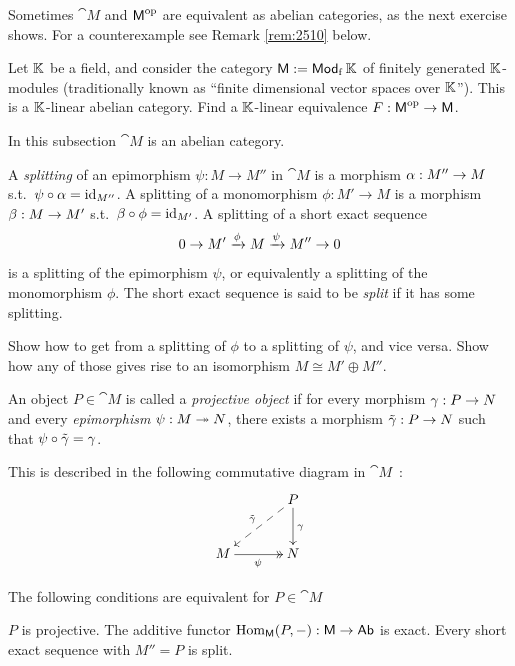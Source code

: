 Sometimes $\cat{M}$ and $\operatorname{\mathsf{M}}^{\mathrm{op}}$ are equivalent as abelian 
categories, as the next exercise shows. For a counterexample see Remark 
\ref{rem:2510} below. 

\begin{exer} \label{exer:2515}
Let $\mathbb{K}$ be a field, and consider the category 
$\operatorname{\mathsf{M}} := \operatorname{\mathsf{Mod}}_{\mathrm{f}} \mathbb{K}$
of finitely generated $\mathbb{K}$-modules (traditionally known as ``finite dimensional 
vector spaces over $\mathbb{K}$''). This is a $\mathbb{K}$-linear abelian category. 
Find a $\mathbb{K}$-linear equivalence
$F : \operatorname{\mathsf{M}}^{\mathrm{op}} \to \operatorname{\mathsf{M}}$.
\end{exer}



In this subsection $\cat{M}$ is an abelian category.

A {\em splitting} of an epimorphism 
$\psi : M \to M''$ in $\cat{M}$ is a morphism
$\alpha : M'' \to M$ s.t.\ $\psi \circ \alpha = \operatorname{id}_{M''}$.
A splitting of a monomorphism 
$\phi : M' \to M$ is  a morphism $\beta : M \to M'$ s.t.\ 
$\beta \circ \phi = \operatorname{id}_{M'}$.
A splitting of a short exact sequence 
\begin{equation} \label{eqn:1035}
0 \to M' \xrightarrow{\phi} M \xrightarrow{\psi} M'' \to 0
\end{equation}
is a splitting of the epimorphism $\psi$, or equivalently a splitting of the
mono\-morphism $\phi$. The short exact sequence is said to be {\em split} if it
has some splitting. 

\begin{exer} \label{exe:1035}
Show how to get from a splitting of $\phi$  to a splitting of $\psi$, and vice 
versa. Show how any of those gives rise to an isomorphism 
$M \cong M' \oplus M''$. 
\end{exer}

\begin{dfn}
An object $P \in \cat{M}$ is called a 
{\em projective object}%
if for every morphism $\gamma : P \to N$ and every {\em epimorphism}
$\psi : M \twoheadrightarrow N$, there exists a morphism 
$\tilde{\gamma} : P \to N$ such that 
$\psi \circ \tilde{\gamma} = \gamma$. 
\end{dfn}

This is described in the following commutative diagram in $\cat{M}$~: 
\[ \UseTips  \xymatrix @C=8ex @R=6ex {
&
P
\ar[d]^{\ga}
\ar@{-->}[dl]_{\til{\ga}}
\\
M 
\ar@{->>}[r]_{\psi}
&
N
} \]


\begin{prop} \label{prop:1670}
The following conditions are equivalent for $P \in \cat{M}$~\tup{:}
\begin{enumerate}
 $P$ is projective.
 The additive functor 
$\operatorname{Hom}_{\operatorname{\mathsf{M}}}(P, -) : \operatorname{\mathsf{M}} \to \operatorname{\mathsf{Ab}}$
is exact.
 Every short exact sequence \tup{(\ref{eqn:1035})} with 
$M'' = P$ is split.
\end{enumerate}
\end{prop}


